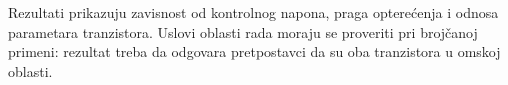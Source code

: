 Rezultati prikazuju zavisnost od kontrolnog napona, praga opterećenja i odnosa parametara tranzistora. Uslovi oblasti rada moraju se proveriti pri brojčanoj primeni: rezultat treba da odgovara pretpostavci da su oba tranzistora u omskoj oblasti.
